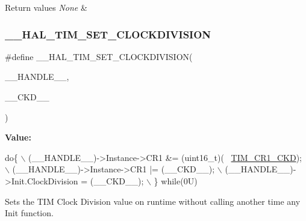 \begin{DoxyRetVals}{Return values}
{\em None} & \\
\hline
\end{DoxyRetVals}
\mbox{\label{group___t_i_m___exported___macros_ga8aa84d77c670890408092630f9b2bdc4}} 
\subsubsection{\texorpdfstring{\+\_\+\+\_\+\+H\+A\+L\+\_\+\+T\+I\+M\+\_\+\+S\+E\+T\+\_\+\+C\+L\+O\+C\+K\+D\+I\+V\+I\+S\+I\+ON}{\_\_HAL\_TIM\_SET\_CLOCKDIVISION}}
{\footnotesize\ttfamily \#define \+\_\+\+\_\+\+H\+A\+L\+\_\+\+T\+I\+M\+\_\+\+S\+E\+T\+\_\+\+C\+L\+O\+C\+K\+D\+I\+V\+I\+S\+I\+ON(\begin{DoxyParamCaption}\item[{}]{\+\_\+\+\_\+\+H\+A\+N\+D\+L\+E\+\_\+\+\_\+,  }\item[{}]{\+\_\+\+\_\+\+C\+K\+D\+\_\+\+\_\+ }\end{DoxyParamCaption})}

{\bfseries Value\+:}
\begin{DoxyCode}
\textcolor{keywordflow}{do}\{                                                             \(\backslash\)
                              (\_\_HANDLE\_\_)->Instance->CR1 &= (uint16\_t)(~
      \mbox{\hyperlink{group___peripheral___registers___bits___definition_gacacc4ff7e5b75fd2e4e6b672ccd33a72}{TIM\_CR1\_CKD}});  \(\backslash\)
                              (\_\_HANDLE\_\_)->Instance->CR1 |= (\_\_CKD\_\_);                 \(\backslash\)
                              (\_\_HANDLE\_\_)->Init.ClockDivision = (\_\_CKD\_\_);             \(\backslash\)
                          \} \textcolor{keywordflow}{while}(0U)
\end{DoxyCode}


Sets the T\+IM Clock Division value on runtime without calling another time any Init function. 


